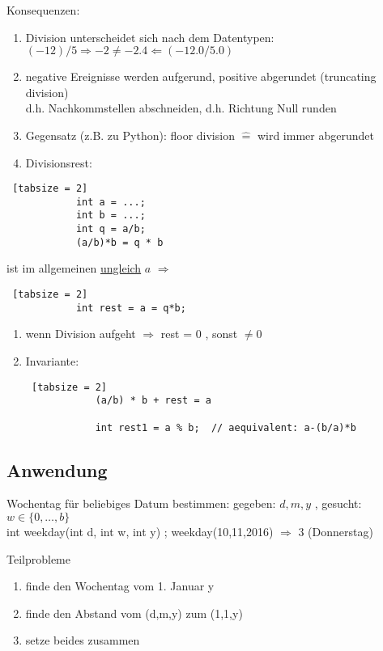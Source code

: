 \documentclass{article}
\begin{document}
	Konsequenzen:
	\begin{enumerate}
		\item Division unterscheidet sich nach dem Datentypen: $(-12)/5 \Rightarrow -2 \neq -2.4 \Leftarrow (-12.0/5.0)$
		\item negative Ereignisse werden aufgerund, positive abgerundet (truncating division) \\
				d.h. Nachkommstellen abschneiden, d.h. Richtung Null runden
		\item Gegensatz (z.B. zu Python): floor division $\widehat{=}$ wird immer abgerundet
		\item Divisionsrest: 
			\end{enumerate}
		\begin{lstlisting} [tabsize = 2]
			int a = ...;
			int b = ...;
			int q = a/b;
			(a/b)*b = q * b
		\end{lstlisting}
		ist im allgemeinen \underline{ungleich} $a$ $\Rightarrow$ 
		\begin{lstlisting} [tabsize = 2]
			int rest = a = q*b;
		\end{lstlisting}
		\begin{enumerate}
		\item wenn Division aufgeht $\Rightarrow$ rest = 0 , sonst $\neq 0$
		\item Invariante: 
		\begin{lstlisting} [tabsize = 2]
			(a/b) * b + rest = a
			
			int rest1 = a % b;  // aequivalent: a-(b/a)*b
		\end{lstlisting}
	\end{enumerate}
	
	\subsection{Anwendung}
	
	Wochentag für beliebiges Datum bestimmen:
	gegeben: $d,m,y$ , gesucht: $w \in \{0,\dots , b\}$ \\
		int weekday(int d, int w, int y) {}  ; weekday(10,11,2016) $\Rightarrow$ 3 (Donnerstag)
		
		Teilprobleme
		\begin{enumerate}
				\item finde den Wochentag vom 1. Januar y
				\item finde den Abstand vom (d,m,y) zum (1,1,y)
				\item setze beides zusammen \\

		\end{enumerate}
		
\end{document}
